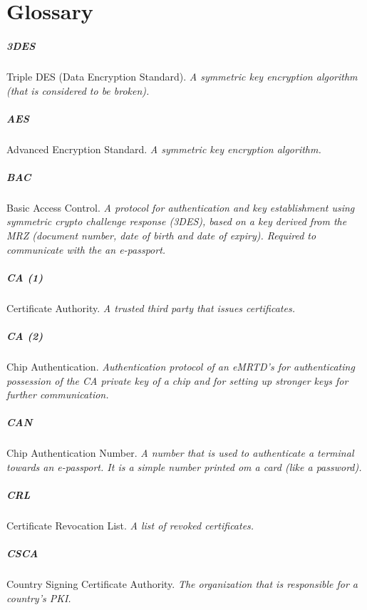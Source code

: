 \chapter{Glossary}\label{ch:glossary}
\paragraph{3DES} Triple DES (Data Encryption Standard). \textit{A symmetric key encryption algorithm (that is considered to be broken).}
\paragraph{AES} Advanced Encryption Standard. \textit{A symmetric key encryption algorithm.}
\paragraph{BAC} Basic Access Control. \textit{A protocol for authentication and key establishment using symmetric crypto challenge response (3DES), based on a key derived from the MRZ (document number, date of birth and date of expiry). Required to communicate with the an e-passport.}
\paragraph{CA (1)} Certificate Authority. \textit{A trusted third party that issues certificates.}
\paragraph{CA (2)} Chip Authentication. \textit{Authentication protocol of an eMRTD's for authenticating possession of the CA private key of a chip and for setting up stronger keys for further communication.}
\paragraph{CAN} Chip Authentication Number. \textit{A number that is used to authenticate a terminal towards an e-passport. It is a simple number printed om a card (like a password).}
\paragraph{CRL} Certificate Revocation List. \textit{A list of revoked certificates.}
\paragraph{CSCA} Country Signing Certificate Authority. \textit{The organization that is responsible for a country’s PKI.}
